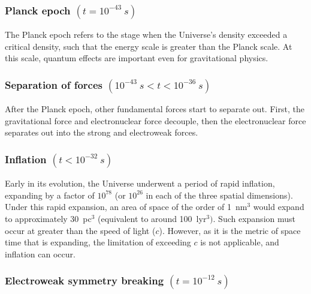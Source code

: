 \documentclass[]{book}
\begin{document}
\subsubsection*{\texorpdfstring{Planck epoch
\((t = 10^{-43}~s)\)}{Planck epoch (t = 10\^{}\{-43\}\textasciitilde{}s)}}\label{planck-epoch-t-10-43s}

The Planck epoch refers to the stage when the Universe's density
exceeded a critical density, such that the energy scale is greater than
the Planck scale. At this scale, quantum effects are important even for
gravitational physics.

\subsubsection*{\texorpdfstring{Separation of forces
\((10^{-43}~s < t < 10^{-36}~s)\)}{Separation of forces (10\^{}\{-43\}\textasciitilde{}s \textless{} t \textless{} 10\^{}\{-36\}\textasciitilde{}s)}}\label{separation-of-forces-10-43s-t-10-36s}

After the Planck epoch, other fundamental forces start to separate out.
First, the gravitational force and electronuclear force decouple, then
the electronuclear force separates out into the strong and electroweak
forces.

\subsubsection*{\texorpdfstring{Inflation
\((t < 10^{-32}~s)\)}{Inflation (t \textless{} 10\^{}\{-32\}\textasciitilde{}s)}}\label{inflation-t-10-32s}

Early in its evolution, the Universe underwent a period of rapid
inflation, expanding by a factor of \(10^{78}\) (or \(10^{26}\) in each
of the three spatial dimensions). Under this rapid expansion, an area of
space of the order of 1~nm\(^{3}\) would expand to approximately
30~pc\(^{3}\) (equivalent to around 100~lyr\(^{3})\). Such expansion
must occur at greater than the speed of light (\(c\)). However, as it is
the metric of space time that is expanding, the limitation of exceeding
\(c\) is not applicable, and inflation can occur.

\subsubsection*{\texorpdfstring{Electroweak symmetry breaking
\((t = 10^{-12}~s)\)}{Electroweak symmetry breaking (t = 10\^{}\{-12\}\textasciitilde{}s)}}\label{electroweak-symmetry-breaking-t-10-12s}
\end{document}
